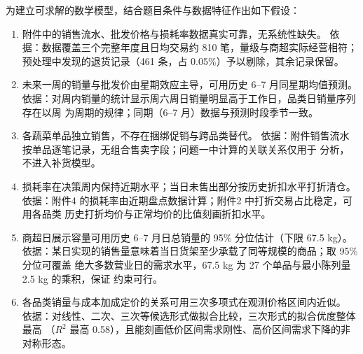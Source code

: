 
为建立可求解的数学模型，结合题目条件与数据特征作出如下假设：

\begin{enumerate}[label=（\arabic*）]
\item 附件中的销售流水、批发价格与损耗率数据真实可靠，无系统性缺失。
  依据：数据覆盖三个完整年度且日均交易约 810 笔，量级与商超实际经营相符；
  预处理中发现的退货记录（461 条，占 0.05\%）予以剔除，其余记录保留。

\item 未来一周的销量与批发价由星期效应主导，可用历史 6--7 月同星期均值预测。
  依据：对周内销量的统计显示周六周日销量明显高于工作日，品类日销量序列存在以周
  为周期的规律；同期（6--7 月）数据与预测时段季节一致。

\item 各蔬菜单品独立销售，不存在捆绑促销与跨品类替代。
  依据：附件销售流水按单品逐笔记录，无组合售卖字段；问题一中计算的关联关系仅用于
  分析，不进入补货模型。

\item 损耗率在决策周内保持近期水平；当日未售出部分按历史折扣水平打折清仓。
  依据：附件4 的损耗率由近期盘点数据计算；附件2 中打折交易占比稳定，可用各品类
  历史打折均价与正常均价的比值刻画折扣水平。

\item 商超日展示容量可用历史 6--7 月日总销量的 95\% 分位估计（下限 67.5 kg）。
  依据：某日实现的销售量意味着当日货架至少承载了同等规模的商品；取 95\% 分位可覆盖
  绝大多数营业日的需求水平，67.5 kg 为 27 个单品与最小陈列量 2.5 kg 的乘积，保证
  约束可行。

\item 各品类销量与成本加成定价的关系可用三次多项式在观测价格区间内近似。
  依据：对线性、二次、三次等候选形式做拟合比较，三次形式的拟合优度整体最高
  （$R^2$ 最高 0.58），且能刻画低价区间需求刚性、高价区间需求下降的非对称形态。
\end{enumerate}
